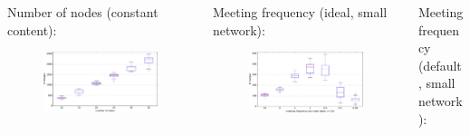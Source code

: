 \documentclass[final,hyperref={pdfpagelabels=false}]{beamer}
\begin{document}
\begin{frame}
\begin{columns}
\begin{column}{.9\textwidth}
  \begin{columns}
  \begin{column}{.3\textwidth}
    \begin{center}
      Number of nodes (constant content):
    \end{center}
    \begin{figure}
      \includegraphics[width=\linewidth]{fig/n_with_same_edits.pdf}
    \end{figure}
  \end{column}
  \begin{column}{.3\textwidth}
    \begin{center}
    Meeting frequency (ideal, small network):
    \end{center}
    \begin{figure}
      \includegraphics[width=\linewidth]{fig/global_meeting_frequency_n=10.pdf}
    \end{figure}
  \end{column}
  \begin{column}{.3\textwidth}
    \begin{center}
    Meeting frequency (default, small network):
    \end{center}

\end{column}
\end{columns}
\end{column}
\end{columns}
\end{frame}
\end{document}
